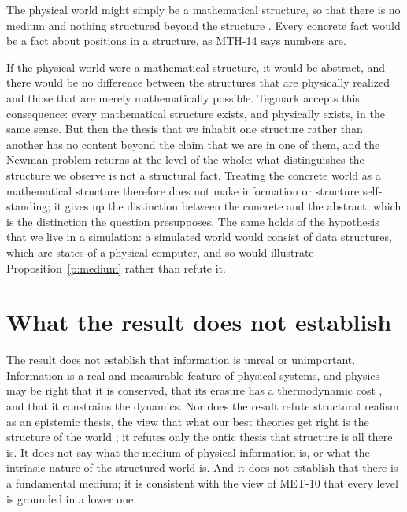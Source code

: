 \documentclass{situationist-preprint}
\begin{document}
\begin{objection}\label{o:math}
The physical world might simply be a mathematical structure, so that there is no medium and nothing structured beyond the structure \citep{Tegmark2008}. Every concrete fact would be a fact about positions in a structure, as MTH-14 says numbers are.
\end{objection}

\begin{reply}
If the physical world were a mathematical structure, it would be abstract, and there would be no difference between the structures that are physically realized and those that are merely mathematically possible. Tegmark accepts this consequence: every mathematical structure exists, and physically exists, in the same sense. But then the thesis that we inhabit one structure rather than another has no content beyond the claim that we are in one of them, and the Newman problem returns at the level of the whole: what distinguishes the structure we observe is not a structural fact. Treating the concrete world as a mathematical structure therefore does not make information or structure self-standing; it gives up the distinction between the concrete and the abstract, which is the distinction the question presupposes. The same holds of the hypothesis that we live in a simulation: a simulated world would consist of data structures, which are states of a physical computer, and so would illustrate Proposition~\ref{p:medium} rather than refute it.
\end{reply}


\section{What the result does not establish}\label{s:limits}

The result does not establish that information is unreal or unimportant. Information is a real and measurable feature of physical systems, and physics may be right that it is conserved, that its erasure has a thermodynamic cost \citep{Landauer1991}, and that it constrains the dynamics. Nor does the result refute structural realism as an epistemic thesis, the view that what our best theories get right is the structure of the world \citep{Worrall1989}; it refutes only the ontic thesis that structure is all there is. It does not say what the medium of physical information is, or what the intrinsic nature of the structured world is. And it does not establish that there is a fundamental medium; it is consistent with the view of MET-10 that every level is grounded in a lower one.
\end{document}
